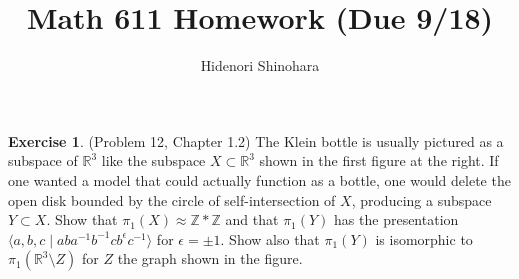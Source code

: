 \documentclass[12pt, psamsfonts]{amsart}
\theoremstyle{definition}
\newtheorem*{exer}{Exercise}
\theoremstyle{remark}
\numberwithin{equation}{section}
\begin{document}
\title{Math 611 Homework (Due 9/18)}
\author{Hidenori Shinohara}
\maketitle


\begin{exer}{(Problem 12, Chapter 1.2)}
  The Klein bottle is usually pictured as a subspace of $\mathbb{R}^3$ like the subspace $X \subset \mathbb{R}^3$ shown in the first figure at the right.
  If one wanted a model that could actually function as a bottle, one would delete the open disk bounded by the circle of self-intersection of $X$, producing a subspace $Y \subset X$.
  Show that $\pi_1(X) \approx \mathbb{Z} * \mathbb{Z}$ and that $\pi_1(Y)$ has the presentation $\langle a, b, c \mid aba^{-1}b^{-1}cb^{\epsilon}c^{-1} \rangle$ for $\epsilon = \pm 1$.
  Show also that $\pi_1(Y)$ is isomorphic to $\pi_1(\mathbb{R}^3 \setminus Z)$ for $Z$ the graph shown in the figure.
\end{exer}
\end{document}
